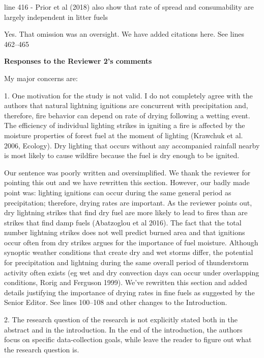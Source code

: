 \documentclass[letterpaper, 12pt]{letter}
\begin{document}
\begin{letter}{}
\begin{quoting}
  line 416 - Prior et al (2018) also show that rate of spread and consumability
  are largely independent in litter fuels
\end{quoting}

Yes. That omission was an oversight. We have added citations here. See lines
462--465

{\bf Responses to the Reviewer 2's comments}

\begin{quoting}

  My major concerns are:
  
  1. One motivation for the study is not valid. I do not completely agree with
  the authors that natural lightning ignitions are concurrent with
  precipitation and, therefore, fire behavior can depend on rate of drying
  following a wetting event. The efficiency of individual lighting strikes in
  igniting a fire is affected by the moisture properties of forest fuel at the
  moment of lighting (Krawchuk et al. 2006, Ecology). Dry lighting that occurs
  without any accompanied rainfall nearby is most likely to cause wildfire
  because the fuel is dry enough to be ignited.
\end{quoting}

Our sentence was poorly written and oversimplified. We thank the reviewer for
pointing this out and we have rewritten this section. However, our badly made
point was: lighting ignitions can occur during the same general period as
precipitation; therefore, drying rates are important. As the reviewer points
out, dry lightning strikes that find dry fuel are more likely to lead to fires
than are strikes that find damp fuels (Abatzoglou et al 2016). The fact that
the total number lightning strikes does not well predict burned area and that
ignitions occur often from dry strikes argues for the importance of fuel
moisture. Although synoptic weather conditions that create dry and wet storms
differ, the potential for precipitation and lightning during the same overall
period of thunderstorm activity often exists (eg wet and dry convection days
can occur under overlapping conditions, Rorig and Ferguson 1999). We've
rewritten this section and added details justifying the importance of drying
rates in fine fuels as suggested by the Senior Editor. See lines 100--108 and
other changes to the Introduction.

\begin{quoting}
  2. The research question of the research is not explicitly stated both in the
  abstract and in the introduction. In the end of the introduction, the authors
  focus on specific data-collection goals, while leave the reader to figure out
  what the research question is.
\end{quoting}


\end{letter}
\end{document}
